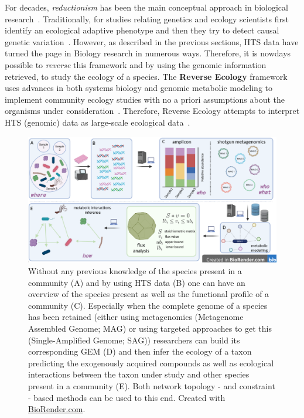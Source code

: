       For decades, \textit{reductionism} has been the main conceptual approach 
      in biological research~\citep{noble2008music}.
      Traditionally, for studies relating genetics and ecology
      scientists first identify an ecological adaptive phenotype 
      and then they try to detect causal genetic variation~\citep{noble2008music}.
      However, as described in the previous sections, HTS data have turned the page in 
      Biology research in numerous ways. 
      Therefore, it is nowdays possible to \textit{reverse} this framework and by 
      using the genomic information retrieved, to study 
      the ecology of a species.
      The \textbf{Reverse Ecology} framework uses advances 
      in both systems biology and genomic metabolic modeling to implement  
      community ecology studies 
      with no a priori assumptions about the organisms under consideration~\citep{cao2016revecor}.
      Therefore, Reverse Ecology 
      attempts to interpret HTS (genomic) data as large-scale ecological data~\citep{levy2012reverse}.

      \begin{figure}[!h]
         \centering
         \includegraphics[width=135mm]{figures/reverse_ecology.png}
         \caption[The \textit{Reverse Ecology} framework.]{Without any previous knowledge of the species present in a community (A) 
         and by using HTS data (B) one can have an overview of the species present 
         as well as the functional profile of a community (C).
         Especially when the complete genome of a species has been retained (either using 
         metagenomics (Metagenome Assembled Genome; MAG) 
         or using targeted approaches to get this (Single-Amplified Genome; SAG))
         researchers can build its corresponding GEM (D) and then 
         infer the ecology of a taxon predicting 
         the exogenously acquired compounds as well as ecological interactions between the taxon under study and other species present in a community (E). 
         Both network topology - and constraint - based methods can be used to this end.
         Created with \href{BioRender.com}{BioRender.com}.
         }
         \label{fig:revecol}
      \end{figure}


